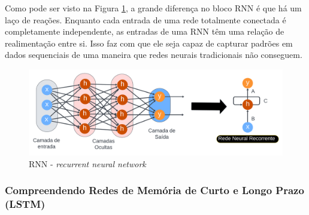 Como pode ser visto na Figura \ref{fig:rnn1}, a grande diferença no bloco RNN é que há um laço de reações. Enquanto cada entrada de uma rede totalmente conectada é completamente independente, as entradas de uma RNN têm uma relação de realimentação entre si. Isso faz com que ele seja capaz de capturar padrões em dados sequenciais de uma maneira que redes neurais tradicionais não conseguem.



\begin{figure}[!htb]
	\centering
	\caption{RNN - \textit{recurrent neural network}}
	\label{fig:rnn1}
	\includegraphics[width=\linewidth]{Apendices/Figuras/modelagem-24h/rnn1}
	
\end{figure}

\subsubsection{Compreendendo Redes de Mem\'oria de Curto e Longo Prazo (LSTM)}

